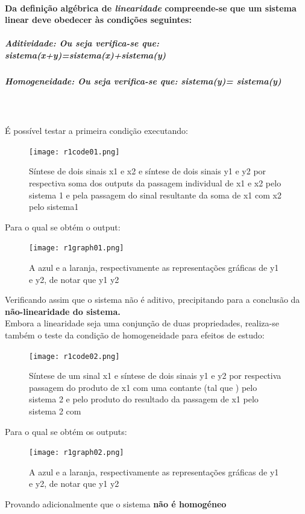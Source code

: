 \documentclass[a4paper,12pt]{article}
\begin{document}
			\paragraph{Da definição algébrica de \textit{linearidade} compreende-se que um sistema linear deve obedecer às condições seguintes:}
				\subparagraph{\textbf{Aditividade:} Ou seja verifica-se que: \textit{sistema(x+y)=sistema(x)+sistema(y)}}
				\subparagraph{\textbf{Homogeneidade: Ou seja verifica-se que: \textit{sistema(}}\textbf{\alpha \textit{y)=} \alpha \textbf{\textit{sistema(y)}}}} \mbox{}\\ \mbox{}\\
			É possível testar a primeira condição executando:
			\begin{figure}[H]
				\centering
					\captionsetup{justification=centering}
					\texttt{[image: r1code01.png]}
					\caption{Síntese de dois sinais x1 e x2 e síntese de dois sinais y1 e y2 por respectiva soma dos outputs da passagem individual de x1   e x2 pelo sistema 1 e pela passagem do sinal resultante da soma de x1 com x2 pelo sistema1}
			\end{figure}
			Para o qual se obtém o output:
			\begin{figure}[H]
  				\centering
  				\captionsetup{justification=centering}
  				\texttt{[image: r1graph01.png]}
				\caption{A azul e a laranja, respectivamente as representações gráficas de y1 e y2, de notar que y1 \neq y2}
			\end{figure}
			Verificando assim que o sistema não é aditivo, precipitando para a conclusão da  \textbf{não-linearidade do sistema.}\\
			Embora a linearidade seja uma conjunção de duas propriedades, realiza-se também o teste da condição de homogeneidade para efeitos de estudo:
 			\begin{figure}[H]
  				\centering
  				\captionsetup{justification=centering}
  				\texttt{[image: r1code02.png]}
				\caption{Síntese de um sinal x1 e síntese de dois sinais y1 e y2 por respectiva passagem do produto de x1 com uma contante \textbeta (tal que ) pelo sistema 2 e pelo produto do resultado da passagem de x1 pelo sistema 2 com \textbeta}
  			\end{figure}
			Para o qual se obtém os outputs:
			\begin{figure}[H]
    				\centering
    				\captionsetup{justification=centering}
    				\texttt{[image: r1graph02.png]}
				\caption{A azul e a laranja, respectivamente as representações gráficas de y1   e y2, de notar que y1 \neq y2}
  			\end{figure}
			Provando adicionalmente que o sistema \textbf{não é homogéneo}
			\newpage
\end{document}
